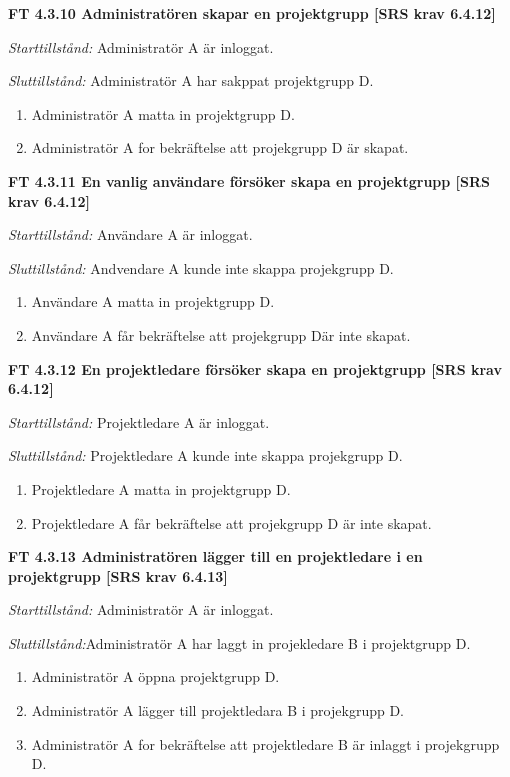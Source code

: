 \documentclass[a4paper]{article}
\begin{document}
\textbf{FT 4.3.10 Administratören skapar en projektgrupp [SRS krav 6.4.12]}

\emph{Starttillstånd:} Administratör A är inloggat.

\emph{Sluttillstånd:} Administratör A har sakppat projektgrupp D.

\begin{enumerate}
\item Administratör A matta in projektgrupp D.
\item Administratör A for bekräftelse att projekgrupp D är skapat.
\end{enumerate}

\textbf{FT 4.3.11 En vanlig användare försöker skapa en projektgrupp [SRS krav 6.4.12]}

\emph{Starttillstånd:} Användare A är inloggat.

\emph{Sluttillstånd:} Andvendare A kunde inte skappa projekgrupp D.

\begin{enumerate}
\item Användare A matta in projektgrupp D.
\item Användare A får bekräftelse att projekgrupp Där inte skapat.
\end{enumerate}

\textbf{FT 4.3.12 En projektledare försöker skapa en projektgrupp [SRS krav 6.4.12]}

\emph{Starttillstånd:} Projektledare A är inloggat.

\emph{Sluttillstånd:} Projektledare A kunde inte skappa projekgrupp D.

\begin{enumerate}
\item Projektledare A matta in projektgrupp D.
\item Projektledare A får bekräftelse att projekgrupp D är inte skapat.
\end{enumerate}

\textbf{FT 4.3.13 Administratören lägger till en projektledare i en projektgrupp [SRS krav 6.4.13]}

\emph{Starttillstånd:} Administratör A är inloggat.

\emph{Sluttillstånd:}Administratör A har laggt in projekledare B i projektgrupp D.

\begin{enumerate}
\item Administratör A öppna projektgrupp D.
\item Administratör A lägger till projektledara B i projekgrupp D.
\item Administratör A for bekräftelse att projektledare B är inlaggt  i  projekgrupp D.
\end{enumerate}
\end{document}
